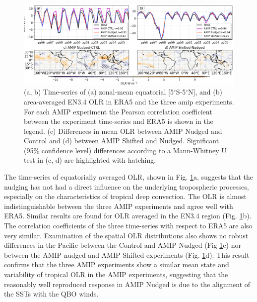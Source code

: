 \begin{figure}[t!]
\centering
 \includegraphics[width=\linewidth]{figures/olr_amip.png}
\caption[OLR time-series and spatial pattern differences in AMIP experiments]{(a, b) Time-series of (a) zonal-mean equatorial [5$^\circ$S-5$^\circ$N], and (b) area-averaged EN3.4 OLR in ERA5 and the three amip experiments. For each AMIP experiment the Pearson correlation coefficient between the experiment time-series and ERA5 is shown in the legend. (c) Differences in mean OLR between AMIP Nudged and Control and (d) between AMIP Shifted and Nudged. Significant (95\% confidence level) differences according to a Mann-Whitney U test in (c, d) are highlighted with hatching. }
\label{fig:olr_amip}
\end{figure}

The time-series of equatorially averaged OLR, shown in Fig. \ref{fig:olr_amip}a, suggests that the nudging has not had a direct influence on the underlying tropospheric processes, especially on the characteristics of tropical deep convection. The OLR is almost indistinguishable between the three AMIP experiments and agree well with ERA5. Similar results are found for OLR averaged in the EN3.4 region (Fig. \ref{fig:olr_amip}b). The correlation coefficients of the three time-series with respect to ERA5 are also very similar. Examination of the spatial OLR distributions also shows no robust differences in the Pacific between the Control and AMIP Nudged (Fig \ref{fig:olr_amip}c) nor between the AMIP nudged and AMIP Shifted experiments (Fig. \ref{fig:olr_amip}d). 
This result confirms that the three AMIP experiments show a similar mean state and variability of tropical OLR in the AMIP experiments, suggesting that the reasonably well reproduced response in AMIP Nudged is due to the alignment of the SSTs with the QBO winds.

